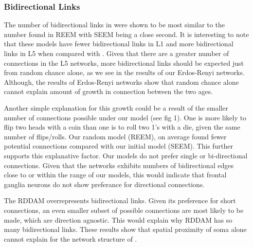 \subsubsection{Bidirectional Links} The number of bidirectional links in \ce were shown to be most similar to the number found in REEM with SEEM being a close second. 
It is interesting to note that these models have fewer bidirectional links in L1 and more bidirectional links in L5 when compared with \ce. 
Given that there are a greater number of connections in the L5 networks, more bidirectional links should be expected just from random chance alone, as we see in the results of our Erdos-Renyi networks. 
Although, the results of Erdos-Renyi networks show that random chance alone cannot explain amount of growth in connection between the two ages. 

Another simple explanation for this growth could be a result of the smaller number of connections possible under our model (see fig 1). 
One is more likely to flip two heads with a coin than one is to roll two 1's with a die, given the same number of flips/rolls. 
Our random model (REEM), on average found fewer potential connections compared with our initial model (SEEM). 
This further supports this explanative factor. 
Our models do not prefer single or bi-directional connections.
Given that the \ce networks exhibits numbers of bidirectional edges close to or within the range of our models, this would indicate that \ce frontal ganglia neurons do not show preferance for directional connections.

The RDDAM overrepresents bidirectional links. 
Given its preference for short connections, an even smaller subset of possible connections are most likely to be made, which are direction agnostic. 
This would explain why RDDAM has so many bidirectional links. 
These results show that spatial proximity of soma alone cannot explain for the network structure of \ce.
